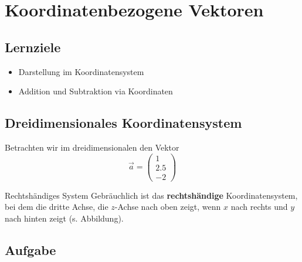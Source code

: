 \section{Koordinatenbezogene Vektoren}

\subsection*{Lernziele}
\begin{itemize}
\item Darstellung im Koordinatensystem
\item Addition und Subtraktion via Koordinaten
\end {itemize}

\subsection{Dreidimensionales Koordinatensystem}

Betrachten wir im dreidimensionalen den Vektor
$$\vec{a} = \begin{pmatrix}1 \\ 2.5 \\ -2\end{pmatrix}$$


  \begin{bemerkung}{Rechtshändiges System}{}
Gebräuchlich ist das \textbf{rechtshändige} Koordinatensystem, bei dem
die dritte Achse, die $z$-Achse nach oben zeigt, wenn $x$ nach rechts
und $y$ nach hinten zeigt (s. Abbildung).
  \end{bemerkung}



\subsection*{Aufgabe}

  \newpage

